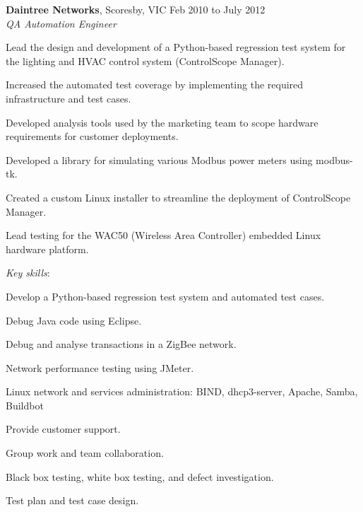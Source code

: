 \documentclass[line,margin]{res}
\begin{document}
\begin{resume}
        \textbf{Daintree Networks}, Scoresby, VIC \hfill Feb 2010 to July 2012 \\
        \textit{QA Automation Engineer}
        \begin{list}{}{\leftmargin=1em \itemsep=-2pt}
            \item{Lead the design and development of a Python-based regression test system for the lighting and HVAC control system (ControlScope Manager).}
            \item{Increased the automated test coverage by implementing the required infrastructure and test cases.}
            \item{Developed analysis tools used by the marketing team to scope hardware requirements for customer deployments.}
            \item{Developed a library for simulating various Modbus power meters using modbus-tk.}
            \item{Created a custom Linux installer to streamline the deployment of ControlScope Manager.}
            \item{Lead testing for the WAC50 (Wireless Area Controller) embedded Linux hardware platform.}
        \end{list}

        \textit{Key skills}:
        \begin{list}{}{\leftmargin=1em \itemsep=-2pt}
            \item{Develop a Python-based regression test system and automated test cases.}
            \item{Debug Java code using Eclipse.}
            \item{Debug and analyse transactions in a ZigBee network.}
            \item{Network performance testing using JMeter.}
            \item{Linux network and services administration: BIND, dhcp3-server, Apache, Samba, Buildbot}
            \item{Provide customer support.}
            \item{Group work and team collaboration.}
            \item{Black box testing, white box testing, and defect investigation.}
            \item{Test plan and test case design.}
        \end{list}
             

\end{resume}
\end{document}
